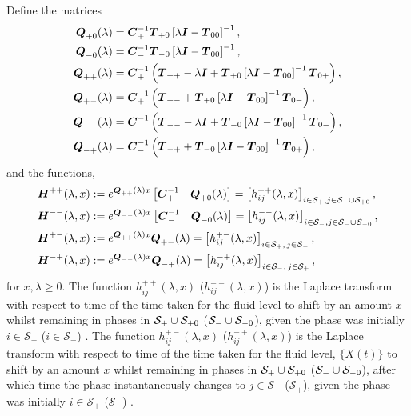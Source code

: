 Define the matrices
\begin{align*}
	\boldsymbol Q_{+0}(\lambda) &= \boldsymbol C_+^{-1}\boldsymbol T_{+0}\left[\lambda \boldsymbol I - \boldsymbol T_{00}\right]^{-1},
	\\\boldsymbol Q_{-0}(\lambda) &= \boldsymbol C_-^{-1}\boldsymbol T_{-0}\left[\lambda \boldsymbol I - \boldsymbol T_{00}\right]^{-1},
	\\\boldsymbol Q_{++}(\lambda) &= \boldsymbol C_+^{-1} \left(\boldsymbol T_{++} - \lambda \boldsymbol I + \boldsymbol T_{+0}\left[\lambda \boldsymbol I - \boldsymbol T_{00}\right]^{-1}\boldsymbol T_{0+}\right),
	\\\boldsymbol Q_{+-}(\lambda) &= \boldsymbol C_+^{-1} \left(\boldsymbol T_{+-} + \boldsymbol T_{+0}\left[\lambda \boldsymbol I - \boldsymbol T_{00}\right]^{-1}\boldsymbol T_{0-} \right) ,
	\\\boldsymbol Q_{--}(\lambda) &= \boldsymbol C_-^{-1} \left(\boldsymbol T_{--}  - \lambda \boldsymbol I + \boldsymbol T_{-0}\left[\lambda \boldsymbol I - \boldsymbol T_{00}\right]^{-1}\boldsymbol T_{0-}\right),
	\\\boldsymbol Q_{-+}(\lambda) &=\boldsymbol C_-^{-1} \left(\boldsymbol T_{-+}+ \boldsymbol T_{-0}\left[\lambda \boldsymbol I - \boldsymbol T_{00}\right]^{-1}\boldsymbol T_{0+}\right) ,
\end{align*}
and the functions,
\begin{align}
	\boldsymbol H^{++}(\lambda,x) &:= e^{\boldsymbol{Q}_{++}(\lambda)x}\begin{bmatrix} \boldsymbol C_+^{-1} & \boldsymbol Q_{+0}(\lambda) \end{bmatrix} = \left[h_{ij}^{++}(\lambda,x)\right]_{i\in \mathcal S_+,j\in\mathcal S_{+}\cup\mathcal{S}_{+0}}, \label{eqn: lst 1}
	\\\boldsymbol H^{--}(\lambda,x) &:= e^{\boldsymbol{Q}_{--}(\lambda)x}\begin{bmatrix} \boldsymbol C_-^{-1} & \boldsymbol Q_{-0}(\lambda) \end{bmatrix} = \left[h_{ij}^{--}(\lambda,x)\right]_{i\in\mathcal S_-,j\in\mathcal S_{-}\cup\mathcal{S}_{-0}},
	\\\boldsymbol H^{+-}(\lambda,x) &:= e^{\boldsymbol{Q}_{++}(\lambda)x}\boldsymbol{Q}_{+-}(\lambda) = \left[h_{ij}^{+-}(\lambda,x)\right]_{i\in\mathcal S_+,\,j\in\mathcal S_-}, 
	\\\boldsymbol H^{-+}(\lambda,x) &:= e^{\boldsymbol{Q}_{--}(\lambda)x}\boldsymbol{Q}_{-+}(\lambda) = \left[h_{ij}^{-+}(\lambda,x)\right]_{i\in\mathcal S_-,\, j\in\mathcal S_+}, \label{eqn: lst 4}
\end{align}
for \(x,\lambda\geq 0\). The function \(h_{ij}^{++}(\lambda,x)\) (\(h_{ij}^{--}(\lambda,x)\)) is the Laplace transform with respect to time of the time taken for the fluid level to shift by an amount \(x\) whilst remaining in phases in \(\mathcal S_+\cup\mathcal{S}_{+0}\) (\(\mathcal S_-\cup\mathcal{S}_{-0}\)), given the phase was initially \(i\in\mathcal S_+\) (\(i\in\mathcal S_-\)) \citep{bean2005}. The function \(h_{ij}^{+-}(\lambda,x)\) (\(h_{ij}^{-+}(\lambda,x)\)) is the Laplace transform with respect to time of the time taken for the fluid level, \(\{X(t)\}\) to shift by an amount \(x\) whilst remaining in phases in \(\mathcal S_+\cup\mathcal{S}_{+0}\) (\(\mathcal S_-\cup\mathcal{S}_{-0}\)), after which time the phase instantaneously changes to \(j\in\mathcal S_-\) (\(\mathcal S_+\)), given the phase was initially \(i\in\mathcal S_+\) (\(\mathcal S_-\)) \citep{bean2005}.

